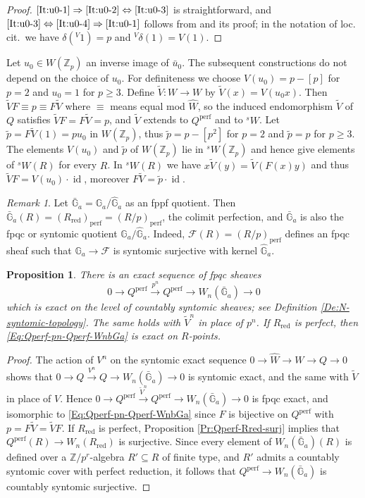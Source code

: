 \documentclass[a4paper,11pt]{amsart}
\theoremstyle{plain}
\newtheorem{Prop}[equation]{Proposition}
\theoremstyle{definition}
\theoremstyle{remark}
\newtheorem{Remark}[equation]{Remark}
\newcommand{\bPr}{\begin{Prop}}
\newcommand{\ePr}{\end{Prop}}
\newcommand{\bRe}{\begin{Remark}}
\newcommand{\eRe}{\end{Remark}}
\newcommand{\bproof}{\begin{proof}}
\newcommand{\eproof}{\end{proof}}
\newcommand{\beqn}{\begin{equation}}
\newcommand{\eeqn}{\end{equation}}
\numberwithin{equation}{section}
\newcommand{\FFF}{\mathcal{F}}
\newcommand{\GG}{{\mathbb{G}}}
\newcommand{\ZZ}{{\mathbb{Z}}}
\DeclareMathOperator{\id}{id}
\DeclareMathOperator{\perf}{perf}
\DeclareMathOperator{\red}{red}
\newcommand{\limperf}{^{\perf}}
\newcommand{\colimperf}{_{\perf}}
\newcommand{\sW}{{}^sW}
\begin{document}
\bproof
$\eqref{It:u0-1}\Rightarrow\eqref{It:u0-2}\Leftrightarrow\eqref{It:u0-3}$ is straightforward, and $\eqref{It:u0-3}\Leftrightarrow\eqref{It:u0-4}\Rightarrow\eqref{It:u0-1}$ follows from \cite[Lemma 2]{Zink:Dieudonne} and its proof; in the notation of loc.\,cit.\ we have $\delta(^V1)=p$ and $^V\delta(1)=V(1)$.
\eproof

Let $u_0\in W(\ZZ_p)$ an inverse image of $\bar u_0$. The subsequent constructions do not depend on the choice of $u_0$. For definiteness we choose $V(u_0)=p-[p]$ for $p=2$ and $u_0=1$ for $p\ge 3$. Define $\tilde V\colon W\to W$ by $\tilde V(x)=V(u_0x)$. Then $\tilde VF\equiv p\equiv F\tilde V$ where $\equiv$ means equal mod $\hat W$, so the induced endomorphism $\tilde V$ of $Q$ satisfies $\tilde VF=F\tilde V=p$, and $\tilde V$ extends to $Q\limperf$ and to $\sW$. 
Let $\tilde p=F\tilde V(1)=pu_0$ in $W(\ZZ_p)$, thus $\tilde p=p-[p^2]$ for $p=2$ and $\tilde p=p$ for $p\ge 3$. The elements $V(u_0)$ and $\tilde p$ of $W(\ZZ_p)$ lie in $\sW(\ZZ_p)$ and hence give elements of $\sW(R)$ for every $R$.
In $\sW(R)$ we have $x\tilde V(y)=\tilde V(F(x)y)$ and thus $\tilde V F=V(u_0)\cdot\id$, moreover $F\tilde V=\tilde p\cdot\id$.

\bRe
Let $\bar\GG_a=\GG_a/\hat\GG_a$ as an fppf quotient. Then $\bar\GG_a(R)=(R_{\red})\colimperf=(R/p)\colimperf$, the colimit perfection, and $\bar\GG_a$ is also the fpqc or syntomic quotient $\GG_a/\hat\GG_a$. Indeed, $\FFF(R)=(R/p)\colimperf$ defines an fpqc sheaf such that $\GG_a\to\FFF$ is syntomic surjective with kernel $\hat\GG_a$.
\eRe

\bPr
\label{Pr:Qperf-pn-Qperf-WnbGa}
There is an exact sequence of fpqc sheaves
\beqn
\label{Eq:Qperf-pn-Qperf-WnbGa}
0\to Q\limperf\xrightarrow {p^n}Q\limperf\to W_n(\bar\GG_a)\to 0
\eeqn
which is exact on the level of countably syntomic sheaves; see Definition \ref{De:N-syntomic-topology}. The same holds with $\tilde V^n$ in place of $p^n$. If $R_{\red}$ is perfect, then \eqref{Eq:Qperf-pn-Qperf-WnbGa} is exact on $R$-points.
\ePr

\bproof
The action of $V^n$ on the syntomic exact sequence  $0\to\hat W\to W\to Q\to 0$ shows that $0\to Q\xrightarrow {V^n}Q\to W_n(\bar\GG_a)\to 0$ is syntomic exact, and the same with $\tilde V$ in place of $V$. Hence $0\to Q\limperf\xrightarrow{\tilde V^n}Q\limperf\to W_n(\bar\GG_a)\to 0$ is fpqc exact, and isomorphic to \eqref{Eq:Qperf-pn-Qperf-WnbGa} since $F$ is bijective on $Q\limperf$ with $p=F\tilde V=\tilde VF$. 
If $R_{\red}$ is perfect, Proposition \ref{Pr:Qperf-Rred-surj} implies that $Q\limperf(R)\to W_n(R_{\red})$ is surjective. Since every element of $W_n(\bar\GG_a)(R)$ is defined over a $\ZZ/p^r$-algebra $R'\subseteq R$ of finite type, and $R'$ admits a countably syntomic cover with perfect reduction, it follows that $Q\limperf\to W_n(\bar\GG_a)$ is countably syntomic surjective.
\eproof
\end{document}
